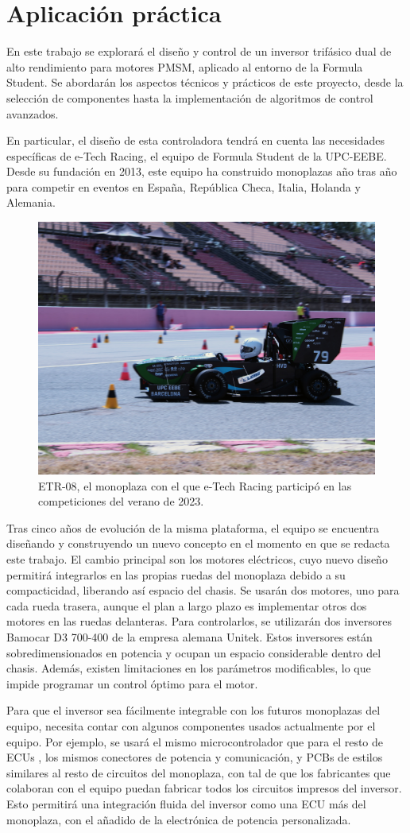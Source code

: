 \section{Aplicación práctica}
En este trabajo se explorará el diseño y control de un inversor trifásico dual de alto rendimiento para motores PMSM, aplicado al entorno de la Formula Student. Se abordarán los aspectos técnicos y prácticos de este proyecto, desde la selección de componentes hasta la implementación de algoritmos de control avanzados.

En particular, el diseño de esta controladora tendrá en cuenta las necesidades específicas de e-Tech Racing, el equipo de Formula Student de la UPC-EEBE. Desde su fundación en 2013, este equipo ha construido monoplazas año tras año para competir en eventos en España, República Checa, Italia, Holanda y Alemania.

\begin{figure}[H]
	\centering
	\includegraphics[width=0.7\linewidth]{fig/IMG_1834}
	\caption{ETR-08, el monoplaza con el que e-Tech Racing participó en las competiciones del verano de 2023.}
\end{figure}

Tras cinco años de evolución de la misma plataforma, el equipo se encuentra diseñando y construyendo un nuevo concepto en el momento en que se redacta este trabajo. El cambio principal son los motores eléctricos, cuyo nuevo diseño permitirá integrarlos en las propias ruedas del monoplaza debido a su compacticidad, liberando así espacio del chasis. Se usarán dos motores, uno para cada rueda trasera, aunque el plan a largo plazo es implementar otros dos motores en las ruedas delanteras. Para controlarlos, se utilizarán dos inversores Bamocar D3 700-400 de la empresa alemana Unitek. Estos inversores están sobredimensionados en potencia y ocupan un espacio considerable dentro del chasis. Además, existen limitaciones en los parámetros modificables, lo que impide programar un control óptimo para el motor.

Para que el inversor sea fácilmente integrable con los futuros monoplazas del equipo, necesita contar con algunos componentes usados actualmente por el equipo. Por ejemplo, se usará el mismo microcontrolador que para el resto de ECUs \cite{Costa2024}, los mismos conectores de potencia y comunicación, y PCBs de estilos similares al resto de circuitos del monoplaza, con tal de que los fabricantes que colaboran con el equipo puedan fabricar todos los circuitos impresos del inversor. Esto permitirá una integración fluida del inversor como una ECU más del monoplaza, con el añadido de la electrónica de potencia personalizada.